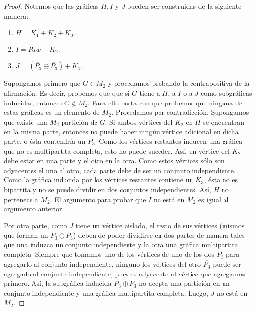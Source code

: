 \begin{proof}

    Notemos que las gráficas $H, I$ y $J$ pueden ser construidas de la siguiente manera:

    \begin{enumerate}[(1)]
        \item $H = K_1 + K_2 + K_3$.
        \item $I = Paw + K_2$.
        \item $J = (\overline{P_3} \oplus \overline{P_3}) + K_1$.
    \end{enumerate}

    Supongamos primero que $G\in M_2$ y procedamos probando la contrapositiva
    de la afirmación. Es decir, probemos que que si $G$ tiene a $H$, a $I$ 
    o a $J$ como subgráficas inducidas, entonces $G\notin M_2$. Para ello basta
    con que probemos que ninguna de estas
    gráficas es un elemento de $M_2$. Procedamos por contradicción. Supongamos
    que existe una $M_2$-partición de $G$. Si ambos vértices del $K_2$ en $H$
    se encuentran en la misma parte, entonces no puede haber ningún vértice
    adicional en dicha parte, o ésta contendría un $\overline{P_3}$. Como los
    vértices restantes inducen una gráfica que no es multipartita completa,
    esto no puede suceder. Así, un vértice del $K_2$ debe estar en una parte y
    el otro en la otra. Como estos vértices sólo son adyacentes el uno al otro,
    cada parte debe de ser un conjunto independiente. Como la gráfica inducida
    por los vértices restantes contiene un $K_3$, ésta no es bipartita y no se
    puede dividir en dos conjuntos independientes. Así, $H$ no pertenece a
    $M_2$. El argumento para probar que $I$ no está en $M_2$ es igual al
    argumento anterior. 
    
    Por otra parte, como $J$ tiene un vértice aislado, el
    resto de sus vértices (mismos que forman un $\overline{P_3} \oplus
    \overline{P_3}$) deben de poder dividirse en dos partes de manera tales que
    una induzca un conjunto independiente y la otra una gráfica multipartita
    completa. Siempre que tomamos uno de los vértices de uno de los dos
    $\overline{P_3}$ para agregarlo al conjunto independiente, ninguno los
    vértices del otro $\overline{P_3}$ puede ser agregado al conjunto
    independiente, pues es adyacente al vértice que agregamos primero. Así, la
    subgráfica inducida $\overline{P_3} \oplus \overline{P_3}$ no acepta una
    partición en un conjunto independiente y una gráfica multipartita completa.
    Luego, $J$ no está en $M_2$.


\end{proof}
